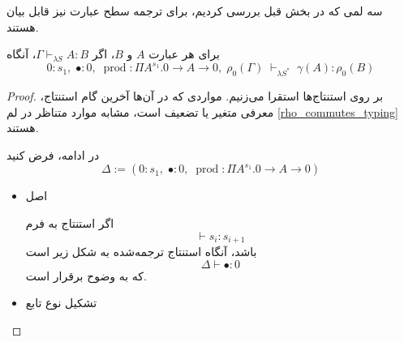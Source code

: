 سه لمی که در بخش قبل بررسی کردیم، برای ترجمه سطح عبارت نیز قابل بیان هستند.

\begin{lmm}\label{preserve_type}
برای هر عبارت
$A$ و $B$،
اگر $\Gamma \vdash_{\lambda S} A:B$، آنگاه
\begin{equation*}
0 : s_1,\; \bullet : 0,\; \operatorname{prod} : \Pi A^{s_1}.0 \to A \to 0,\; \rho_0(\Gamma) \; \vdash_{\lambda S^*} \; \gamma(A) : \rho_0(B)
\end{equation*}
\end{lmm}

\begin{proof}

بر روی استنتاج‌ها استقرا می‌زنیم.
مواردی که در آن‌ها آخرین گام استنتاج، معرفی متغیر یا تضعیف است، مشابه موارد متناظر در لم
\ref{rho_commutes_typing}
هستند.

در ادامه، فرض کنید
\begin{equation*}
\Delta := (0 : s_1,\; \bullet : 0,\; \operatorname{prod} : \Pi A^{s_1}.0 \to A \to 0)
\end{equation*}

\begin{itemize}
\item اصل

اگر استنتاج به فرم
\begin{equation*}
\vdash s_i : s_{i+1}
\end{equation*}
باشد، آنگاه استنتاج ترجمه‌شده به شکل زیر است
\begin{equation*}
\Delta \vdash \bullet : 0
\end{equation*}
که به وضوح برقرار است.

\item تشکیل نوع تابع


\end{itemize}
\end{proof}

